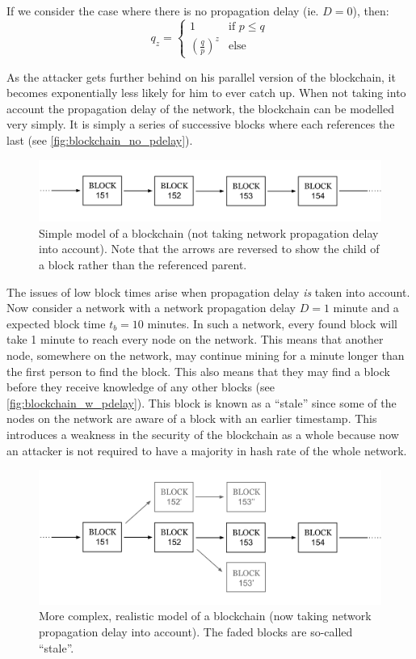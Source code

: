 \documentclass{article}
\begin{document}
If we consider the case where there is no propagation delay (ie. $D = 0$), then:
\[
q_z = 
\begin{cases}
    1                           &\textrm{if } p \leq q \\
    \left(\frac{q}{p}\right)^z  &\textrm{else}
\end{cases}
\]

As the attacker gets further behind on his parallel version of the blockchain, it becomes exponentially less likely for him to ever catch up. When not taking into account the propagation delay of the network, the blockchain can be modelled very simply. It is simply a series of successive blocks where each references the last (see \autoref{fig:blockchain_no_pdelay}).
\begin{figure}[h]
    \centering
    \includegraphics[width=0.9\linewidth]{Images/Diagrams/blockchain_no_pdelay.png}
    \caption{Simple model of a blockchain (not taking network propagation delay into account). Note that the arrows are reversed to show the child of a block rather than the referenced parent.}
    \label{fig:blockchain_no_pdelay}
\end{figure}

The issues of low block times arise when propagation delay \emph{is} taken into account. Now consider a network with a network propagation delay $D = 1$ minute and a expected block time $t_b = 10$ minutes. In such a network, every found block will take 1 minute to reach every node on the network. This means that another node, somewhere on the network, may continue mining for a minute longer than the first person to find the block. This also means that they may find a block before they receive knowledge of any other blocks (see \autoref{fig:blockchain_w_pdelay}). This block is known as a ``stale'' since some of the nodes on the network are aware of a block with an earlier timestamp. This introduces a weakness in the security of the blockchain as a whole because now an attacker is not required to have a majority in hash rate of the whole network.

\begin{figure}[h]
    \centering
    \includegraphics[width=0.9\linewidth]{Images/Diagrams/blockchain_with_pdelay.png}
    \caption{More complex, realistic model of a blockchain (now taking network propagation delay into account). The faded blocks are so-called ``stale''.}
    \label{fig:blockchain_w_pdelay}
\end{figure}
\end{document}
